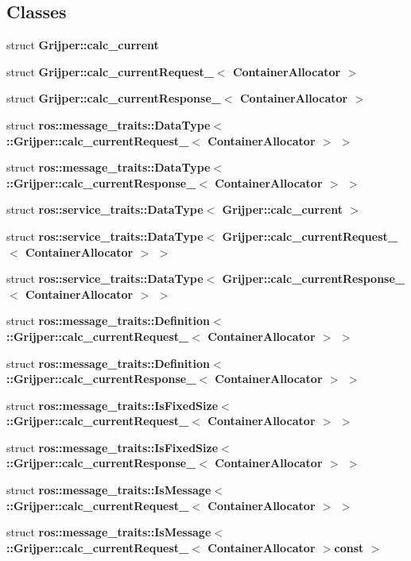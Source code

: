 \subsection*{Classes}
\begin{DoxyCompactItemize}
\item 
struct {\bf Grijper\-::calc\-\_\-current}
\item 
struct {\bf Grijper\-::calc\-\_\-current\-Request\-\_\-$<$ Container\-Allocator $>$}
\item 
struct {\bf Grijper\-::calc\-\_\-current\-Response\-\_\-$<$ Container\-Allocator $>$}
\item 
struct {\bf ros\-::message\-\_\-traits\-::\-Data\-Type$<$ \-::\-Grijper\-::calc\-\_\-current\-Request\-\_\-$<$ Container\-Allocator $>$ $>$}
\item 
struct {\bf ros\-::message\-\_\-traits\-::\-Data\-Type$<$ \-::\-Grijper\-::calc\-\_\-current\-Response\-\_\-$<$ Container\-Allocator $>$ $>$}
\item 
struct {\bf ros\-::service\-\_\-traits\-::\-Data\-Type$<$ Grijper\-::calc\-\_\-current $>$}
\item 
struct {\bf ros\-::service\-\_\-traits\-::\-Data\-Type$<$ Grijper\-::calc\-\_\-current\-Request\-\_\-$<$ Container\-Allocator $>$ $>$}
\item 
struct {\bf ros\-::service\-\_\-traits\-::\-Data\-Type$<$ Grijper\-::calc\-\_\-current\-Response\-\_\-$<$ Container\-Allocator $>$ $>$}
\item 
struct {\bf ros\-::message\-\_\-traits\-::\-Definition$<$ \-::\-Grijper\-::calc\-\_\-current\-Request\-\_\-$<$ Container\-Allocator $>$ $>$}
\item 
struct {\bf ros\-::message\-\_\-traits\-::\-Definition$<$ \-::\-Grijper\-::calc\-\_\-current\-Response\-\_\-$<$ Container\-Allocator $>$ $>$}
\item 
struct {\bf ros\-::message\-\_\-traits\-::\-Is\-Fixed\-Size$<$ \-::\-Grijper\-::calc\-\_\-current\-Request\-\_\-$<$ Container\-Allocator $>$ $>$}
\item 
struct {\bf ros\-::message\-\_\-traits\-::\-Is\-Fixed\-Size$<$ \-::\-Grijper\-::calc\-\_\-current\-Response\-\_\-$<$ Container\-Allocator $>$ $>$}
\item 
struct {\bf ros\-::message\-\_\-traits\-::\-Is\-Message$<$ \-::\-Grijper\-::calc\-\_\-current\-Request\-\_\-$<$ Container\-Allocator $>$ $>$}
\item 
struct {\bf ros\-::message\-\_\-traits\-::\-Is\-Message$<$ \-::\-Grijper\-::calc\-\_\-current\-Request\-\_\-$<$ Container\-Allocator $>$const  $>$}

\end{DoxyCompactItemize}
